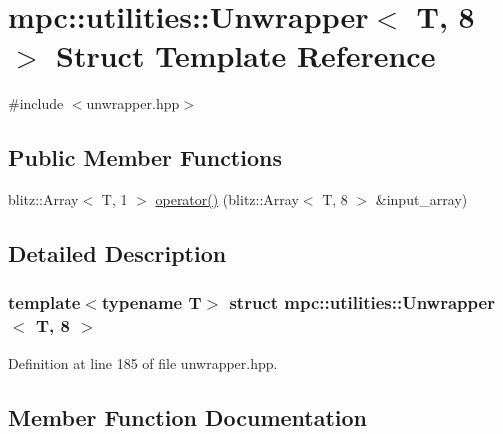 \hypertarget{structmpc_1_1utilities_1_1_unwrapper_3_01_t_00_018_01_4}{}\section{mpc\+:\+:utilities\+:\+:Unwrapper$<$ T, 8 $>$ Struct Template Reference}
\label{structmpc_1_1utilities_1_1_unwrapper_3_01_t_00_018_01_4}


{\ttfamily \#include $<$unwrapper.\+hpp$>$}

\subsection*{Public Member Functions}
\begin{DoxyCompactItemize}
\item 
blitz\+::\+Array$<$ T, 1 $>$ \mbox{\hyperlink{structmpc_1_1utilities_1_1_unwrapper_3_01_t_00_018_01_4_ac92330b5b9979b53366a4233e0f8d1eb}{operator()}} (blitz\+::\+Array$<$ T, 8 $>$ \&input\+\_\+array)
\end{DoxyCompactItemize}


\subsection{Detailed Description}
\subsubsection*{template$<$typename T$>$\newline
struct mpc\+::utilities\+::\+Unwrapper$<$ T, 8 $>$}



Definition at line 185 of file unwrapper.\+hpp.



\subsection{Member Function Documentation}
\mbox{\label{structmpc_1_1utilities_1_1_unwrapper_3_01_t_00_018_01_4_ac92330b5b9979b53366a4233e0f8d1eb}} 
